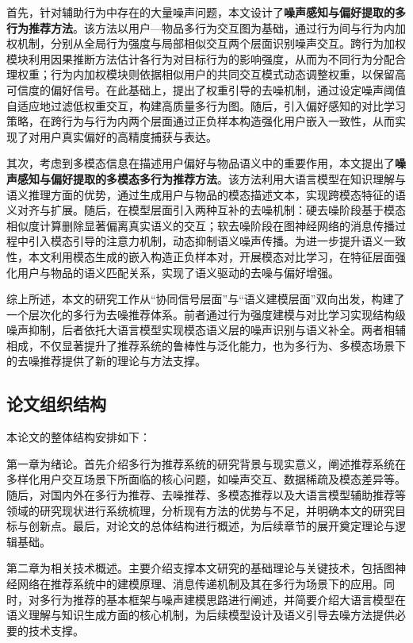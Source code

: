 首先，针对辅助行为中存在的大量噪声问题，本文设计了\textbf{噪声感知与偏好提取的多行为推荐方法}。该方法以用户—物品多行为交互图为基础，通过行为间与行为内加权机制，分别从全局行为强度与局部相似交互两个层面识别噪声交互。跨行为加权模块利用因果推断方法估计各行为对目标行为的影响强度，从而为不同行为分配合理权重；行为内加权模块则依据相似用户的共同交互模式动态调整权重，以保留高可信度的偏好信号。在此基础上，提出了权重引导的去噪机制，通过设定噪声阈值自适应地过滤低权重交互，构建高质量多行为图。随后，引入偏好感知的对比学习策略，在跨行为与行为内两个层面通过正负样本构造强化用户嵌入一致性，从而实现了对用户真实偏好的高精度捕获与表达。

其次，考虑到多模态信息在描述用户偏好与物品语义中的重要作用，本文提出了\textbf{噪声感知与偏好提取的多模态多行为推荐方法}。该方法利用大语言模型在知识理解与语义推理方面的优势，通过生成用户与物品的模态描述文本，实现跨模态特征的语义对齐与扩展。随后，在模型层面引入两种互补的去噪机制：硬去噪阶段基于模态相似度计算删除显著偏离真实语义的交互；软去噪阶段在图神经网络的消息传播过程中引入模态引导的注意力机制，动态抑制语义噪声传播。为进一步提升语义一致性，本文利用模态生成的嵌入构造正负样本对，开展模态对比学习，在特征层面强化用户与物品的语义匹配关系，实现了语义驱动的去噪与偏好增强。

综上所述，本文的研究工作从“协同信号层面”与“语义建模层面”双向出发，构建了一个层次化的多行为去噪推荐体系。前者通过行为强度建模与对比学习实现结构级噪声抑制，后者依托大语言模型实现模态语义层的噪声识别与语义补全。两者相辅相成，不仅显著提升了推荐系统的鲁棒性与泛化能力，也为多行为、多模态场景下的去噪推荐提供了新的理论与方法支撑。

\subsection{论文组织结构}

本论文的整体结构安排如下：

第一章为绪论。首先介绍多行为推荐系统的研究背景与现实意义，阐述推荐系统在多样化用户交互场景下所面临的核心问题，如噪声交互、数据稀疏及模态差异等。随后，对国内外在多行为推荐、去噪推荐、多模态推荐以及大语言模型辅助推荐等领域的研究现状进行系统梳理，分析现有方法的优势与不足，并明确本文的研究目标与创新点。最后，对论文的总体结构进行概述，为后续章节的展开奠定理论与逻辑基础。

第二章为相关技术概述。主要介绍支撑本文研究的基础理论与关键技术，包括图神经网络在推荐系统中的建模原理、消息传递机制及其在多行为场景下的应用。同时，对多行为推荐的基本框架与噪声建模思路进行阐述，并简要介绍大语言模型在语义理解与知识生成方面的核心机制，为后续模型设计及语义引导去噪方法提供必要的技术支撑。

